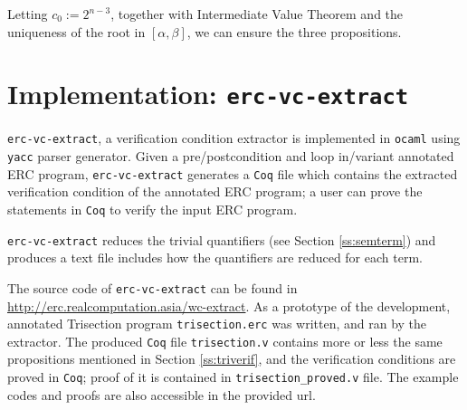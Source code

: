 \documentclass{article}
\begin{document}
Letting $c_0 := 2^{n-3}$, 
together with Intermediate Value Theorem and the uniqueness of the root in $[\alpha,\beta]$,
we can ensure the three propositions.


\section{Implementation: \texttt{erc-vc-extract}}
\texttt{erc-vc-extract}, a verification condition extractor 
is implemented in \texttt{ocaml} using \texttt{yacc} parser generator.
Given a pre/postcondition and loop in/variant annotated ERC program, 
\texttt{erc-vc-extract} generates a \texttt{Coq} file which contains
the extracted verification condition of the annotated ERC program;
a user can prove the statements in \texttt{Coq} to verify the input ERC program.

\texttt{erc-vc-extract} reduces the trivial quantifiers (see Section \ref{ss:semterm}) and
produces a text file includes how the quantifiers are reduced for each term.

The source code of \texttt{erc-vc-extract} can be found in \url{http://erc.realcomputation.asia/wc-extract}.
As a prototype of the development, 
annotated Trisection program \texttt{trisection.erc} was written, and ran by the extractor.
The produced \texttt{Coq} file \texttt{trisection.v} contains more or less the same propositions
mentioned in Section \ref{ss:triverif}, and the verification conditions are proved in \texttt{Coq};
proof of it is contained in \texttt{trisection\_proved.v} file. The example codes and proofs are 
also accessible in the provided url.
\end{document}
